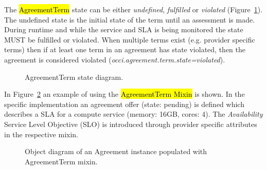 \documentclass[10pt,a4paper]{article}
\begin{document}
The \hl{AgreementTerm} state can be either \textit{undefined}, \textit{fulfilled} or \textit{violated} (Figure~\ref{fig:terms-states}). The undefined state is the initial state of the term until an assessment is made. During runtime and while the service and SLA is being monitored the state MUST be fulfilled or violated. When multiple terms exist (e.g. provider specific terms) then if at least one term in an agreement has state violated, then the agreement is considered violated (\textit{occi.agreement.term.state=violated}).

\begin{figure}[!h]
	{\centering {} \par}
	\caption{AgreementTerm state diagram.}
	\label{fig:terms-states}
\end{figure}

In Figure~\ref{fig:terms-example} an example of using the \hl{AgreementTerm Mixin} is shown. In the specific implementation an agreement offer (state: pending) is defined which describes a SLA for a compute service (memory: 16GB, cores: 4). The \textit{Availability} Service Level Objective (SLO) is introduced through provider specific attributes in the respective mixin.

\begin{figure}[!h]
	{\centering {} \par}
	\caption{Object diagram of an Agreement instance populated with AgreementTerm mixin.}
	\label{fig:terms-example}
\end{figure}
\end{document}

